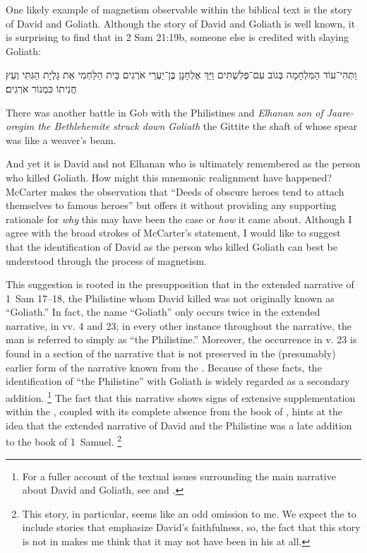 One likely example of magnetism observable within the biblical text is the story of David and Goliath. Although the story of David and Goliath is well known, it is surprising to find that in 2 Sam 21:19b, someone else is credited with slaying Goliath:
\begin{hebrewtext}
    וַתְּהִי־עוֹד הַמִּלְחָמָה בְּגוֹב עִם־פְּלִשְׁתִּים וַיַּךְ אֶלְחָנָן בֶּן־יַעְרֵי אֹרְגִים בֵּית הַלַּחְמִי אֵת גָּלְיָת הַגִּתִּי וְעֵץ חֲנִיתוֹ כִּמְנוֹר אֹרְגִים׃
\end{hebrewtext}
\begin{translation}
    There was another battle in Gob with the Philistines and \emph{Elhanan son of Jaare-oregim the Bethlehemite struck down Goliath} the Gittite the shaft of whose spear was like a weaver's beam.
\end{translation}
\noindent
And yet it is David and not Elhanan who is ultimately remembered as the person who killed Goliath. How might this mnemonic realignment have happened? McCarter makes the observation that ``Deeds of obscure heroes tend to attach themselves to famous heroes''%
    \autocite[450]{mccarter1984}
but offers it without providing any supporting rationale for \emph{why} this may have been the case or \emph{how} it came about. Although I agree with the broad strokes of McCarter's statement, I would like to suggest that the identification of David as the person who killed Goliath can best be understood through the process of magnetism.

This suggestion is rooted in the presupposition that in the extended narrative of 1~Sam 17--18, the Philistine whom David killed was not originally known as ``Goliath.'' In fact, the name ``Goliath'' only occurs twice in the extended narrative, in vv. 4 and 23; in every other instance throughout the narrative, the man is referred to simply as ``the Philistine.'' Moreover, the occurrence in v. 23 is found in a section of the narrative that is not preserved in the (presumably) earlier form of the narrative known from the \lxx. Because of these facts, the identification of ``the Philistine'' with Goliath is widely regarded as a secondary addition.%
    \footnote{For a fuller account of the textual issues surrounding the main narrative about David and Goliath, see 
        \cite[245--265]{hutton2009}
        \cite[280--309]{mccarter1980} and 
        \cite[69--77]{mckenzie2000}.}
The fact that this narrative shows signs of extensive supplementation within the \mt, coupled with its complete absence from the book of \chronicles, hints at the idea that the extended narrative of David and the Philistine was a late addition to the book of 1~Samuel.%
    \footnote{This story, in particular, seems like an odd omission to me. We expect the \chronicler to include stories that emphasize David's faithfulness, so, the fact that this story is not in \chronicles makes me think that it may not have been in his \vorlage at all.}

